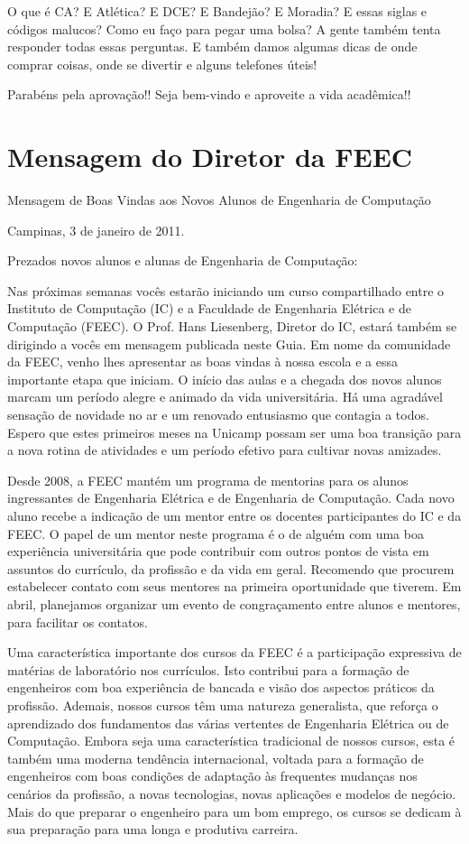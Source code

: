 \documentclass[a4paper,10pt]{article}
\begin{document}
O que é CA? E Atlética? E DCE? E Bandejão? E Moradia? E essas siglas e códigos
malucos? Como eu faço para pegar uma bolsa? A gente também tenta responder todas
essas perguntas. E também damos algumas dicas de onde comprar coisas, onde se
divertir e alguns telefones úteis!

Parabéns pela aprovação!! Seja bem-vindo e aproveite a vida acadêmica!!

\section{Mensagem do Diretor da FEEC}
Mensagem de Boas Vindas aos Novos Alunos de Engenharia de Computação

Campinas, 3 de janeiro de 2011.

Prezados novos alunos e alunas de Engenharia de Computação:

Nas próximas semanas vocês estarão iniciando um curso compartilhado entre
o Instituto de Computação (IC) e a Faculdade de Engenharia Elétrica e de
Computação (FEEC). O Prof. Hans Liesenberg, Diretor do IC, estará também se
dirigindo a vocês em mensagem publicada neste Guia. Em nome da comunidade da
FEEC, venho lhes apresentar as boas vindas à nossa escola e a essa importante
etapa que iniciam. O início das aulas e a chegada dos novos alunos marcam um
período alegre e animado da vida universitária. Há uma agradável sensação de
novidade no ar e um renovado entusiasmo que contagia a todos. Espero que estes
primeiros meses na Unicamp possam ser uma boa transição para a nova rotina de
atividades e um período efetivo para cultivar novas amizades.  

Desde 2008, a FEEC mantém um programa de mentorias para os alunos ingressantes
de Engenharia Elétrica e de Engenharia de Computação. Cada novo aluno recebe
a indicação de um mentor entre os docentes participantes do IC e da FEEC.
O papel de um mentor neste programa é o de alguém com uma boa experiência
universitária que pode contribuir com outros pontos de vista em assuntos do
currículo, da profissão e da vida em geral. Recomendo que procurem estabelecer
contato com seus mentores na primeira oportunidade que tiverem. Em abril,
planejamos organizar um evento de congraçamento entre alunos e mentores, para
facilitar os contatos.

Uma característica importante dos cursos da FEEC é a participação expressiva de
matérias de laboratório nos currículos. Isto contribui para a formação de
engenheiros com boa experiência de bancada e visão dos aspectos práticos da
profissão. Ademais, nossos cursos têm uma natureza generalista, que reforça
o aprendizado dos fundamentos das várias vertentes de Engenharia Elétrica ou de
Computação. Embora seja uma característica tradicional de nossos cursos, esta
é também uma moderna tendência internacional, voltada para a formação de
engenheiros com boas condições de adaptação às frequentes mudanças nos cenários
da profissão, a novas tecnologias, novas aplicações e modelos de negócio. Mais
do que preparar o engenheiro para um bom emprego, os cursos se dedicam à sua
preparação para uma longa e produtiva carreira.
\end{document}
